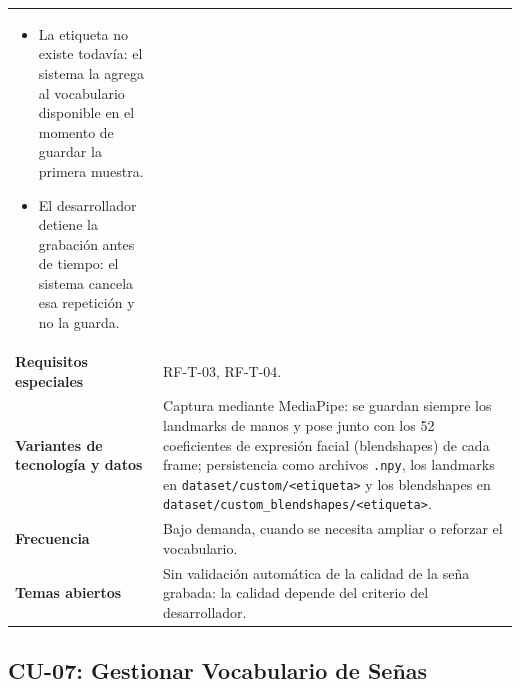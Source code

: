 \begin{longtable}{@{}>{\raggedright\arraybackslash}p{4.1cm} >{\raggedright\arraybackslash}p{\dimexpr\textwidth-4.1cm-2\tabcolsep\relax}@{}}
\begin{itemize}[leftmargin=*, itemsep=2pt]
    \item[2a.] La etiqueta no existe todavía: el sistema la agrega al
    vocabulario disponible en el momento de guardar la primera muestra.
    \item[6a.] El desarrollador detiene la grabación antes de tiempo: el
    sistema cancela esa repetición y no la guarda.
\end{itemize} \\
\textbf{Requisitos especiales} & RF-T-03, RF-T-04. \\
\textbf{Variantes de tecnología y datos} &
Captura mediante MediaPipe: se guardan siempre los landmarks de manos y pose
junto con los 52 coeficientes de expresión facial (blendshapes) de cada frame;
persistencia como archivos \texttt{.npy}, los landmarks en
\texttt{dataset/custom/\textless etiqueta\textgreater} y los blendshapes en
\texttt{dataset/custom\_blendshapes/\textless etiqueta\textgreater}. \\
\textbf{Frecuencia} &
Bajo demanda, cuando se necesita ampliar o reforzar el vocabulario. \\
\textbf{Temas abiertos} &
Sin validación automática de la calidad de la seña grabada: la calidad
depende del criterio del desarrollador. \\
\bottomrule
\end{longtable}

\subsection{CU-07: Gestionar Vocabulario de Señas}

